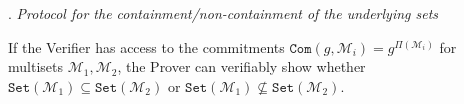 \documentclass[11pt, lettersize, notitlepage, leqno, footskip=0.6cm]{article}
\newcommand{\slim}{\sum\limits}
\newcommand{\ttt}{\texttt}
\newcommand{\bG}{\mathbb{G}}
\newcommand{\sett}{\ttt{Set}}
\newcommand{\mc}{\mathcal}
\newcommand{\mb}{\mathbb}
\newcommand{\mr}{\mathrm}
\newcommand{\lam}{\lambda}
\newcommand{\lamb}{\lambda}
\newcommand{\sub}{\subseteq}
\newcommand{\mP}{\mc{P}}
\newcommand{\V}{\mc{V}}
\newcommand{\mcM}{\mc{M}}
\newcommand{\vs}{\vspace{-0.15cm}}
\newcommand{\noin}{\noindent}
\newcommand{\Mod}[1]{\ (\mathrm{mod}\ #1)}
\newtheorem{Prot}[Thm]{Protocol}
\numberwithin{equation}{section}
\begin{document}
{\noin 18. \textit{Protocol for the containment/non-containment of the underlying sets} \vspace{0.1cm}

\noin If the Verifier has access to the commitments $\ttt{Com}(g, \mcM_i)= g^{\Pi(\mcM_i)}$ for multisets $\mcM_1, \mcM_2$, the Prover can verifiably show whether $\sett(\mcM_1)\sub \sett(\mcM_2)$ or $\sett(\mcM_1)\not\sub \sett(\mcM_2)$.






\vspace{0.2cm}






\bigskip

\newpage




\begin{comment}


\vspace{0.1cm}

\begin{Prot} Protocol for intersection of multisets.\end{Prot} \vspace{-0.3cm}

\noin \textbf{Parameters:} $\mb{G}\xleftarrow{\$} \mr{GGen}(\lamb)$,\; $g\in \mb{G}$.

\noin \textbf{Inputs:} Commitments $A_i := g^{\Pi(\mc{M}_i)}$ for multisets $\mc{M}_i$; an element $A_{\tt{\cap}}\in\mb{G}$

\noin \textbf{Claim:} $A_{\tt{\cap}} = \protect{\verb|Com|}(g, {\bigcap\limits_{i=1}^n} \mc{M}_i) := g^{\Pi({\bigcap\limits_{i=1}^n} \mc{M}_i)}$.

\begin{prf1} \normalfont \noin 1. The Fiat-Shamir heuristic generates a $\lam$-bit challenge $\gammma$.

\noin 2. The Prover computes \vs $$g_1:= g^{\slim{i=1}^n} d_i\gamma^i\;,\;g_2:= g^{\slim{i=1}^n} e_i\gamma^i$$ and sends them to the Verifier $\V$.

\noin 3. The Fiat-Shamir heuristic generates a $\lam$-bit prime $l\not\equiv 1\Mod{p}$.

\noin 4. $\mP$ computes the integers \vs $$r_i:= d_i\Mod{l}\;,\; s_i:= e_i\Mod{l}\;,\;r:= \slim_{i=1}^n r_i\gamma^i\Mod{l}\;,\;s:= \slim_{i=1}^n s_i\gamma^i\Mod{l}.$$

\noin 5. $\mP$ computes elements $Q_1, Q_2\;\in\;\bG$ such that \vs $$Q_1^{l}g^{r} = g_1\;,\; Q_2^{l}g^{s} = g_2.$$ He sends \vs $$Q_1, Q_2,\; (r_1,\cdots,r_n),\;(s_1,\cdots,s_n)$$ to $\V$.


\end{comment}}
\end{document}
